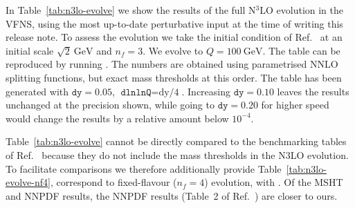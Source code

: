 In Table~\ref{tab:n3lo-evolve} we show the results of the full N$^3$LO
evolution in the VFNS, using the most up-to-date perturbative input at
the time of writing this release note. To assess the evolution we take
the initial condition of Ref.~\cite{Dittmar:2005ed} at an initial
scale $\sqrt{2}~\text{GeV}$ and $n_f=3$. We evolve to
$Q=100~\text{GeV}$. The table can be reproduced by running
. The
numbers are obtained using parametrised NNLO splitting functions, but
exact mass thresholds at this order.
%
The table has been generated with $\texttt{dy}=0.05$,
$\texttt{dlnlnQ}=\text{dy/4}$.
%
Increasing $\texttt{dy}=0.10$ leaves the results unchanged at the
precision shown, while going to $\texttt{dy}=0.20$ for higher speed
would change the results by a relative amount below $10^{-4}$.

Table~\ref{tab:n3lo-evolve} cannot be directly compared to the
benchmarking tables of Ref.~\cite{Cooper-Sarkar:2024crx} because they
do not include the mass thresholds in the N3LO evolution.
%
To facilitate comparisons we therefore additionally provide
Table~\ref{tab:n3lo-evolve-nf4}, correspond to fixed-flavour ($n_f=4$)
evolution, with
.
%
Of the MSHT and NNPDF results, the NNPDF results (Table~2 of
Ref.~\cite{Cooper-Sarkar:2024crx}) are closer to ours.



